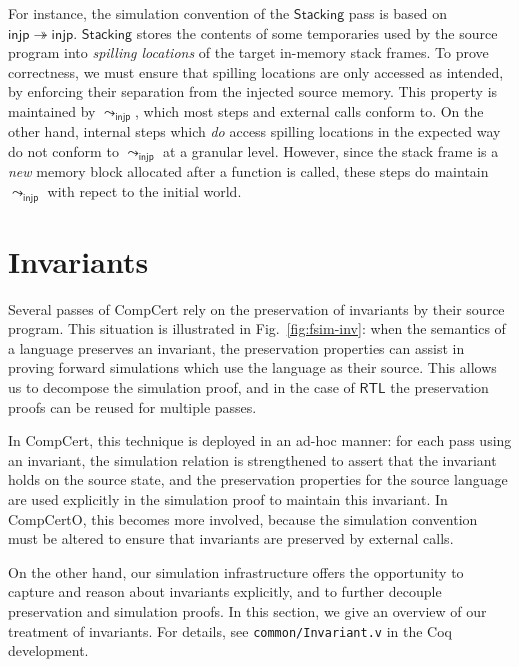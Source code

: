 \documentclass[acmsmall,screen,review,anonymous]{acmart}
\newcommand{\kw}[1]{\ensuremath{ \mathsf{#1} }}
\begin{document}
For instance,
the simulation convention of the \kw{Stacking} pass
is based on $\kw{injp} \twoheadrightarrow \kw{injp}$.
\kw{Stacking} stores the contents of some
temporaries used by the source program
into \emph{spilling locations}
of the target in-memory stack frames.
To prove correctness,
we must ensure that spilling locations
are only accessed as intended,
by enforcing their separation
from the injected source memory.
%
This property is maintained by $\leadsto_\kw{injp}$,
which most steps and external calls conform to.
On the other hand,
internal steps which \emph{do} access spilling locations
in the expected way
do not conform to $\leadsto_\kw{injp}$ at a granular level.
However,
since the stack frame is a \emph{new}
memory block allocated after a function is called,
these steps do maintain $\leadsto_\kw{injp}$
with repect to the initial world.



\section{Invariants} \label{sec:inv} %


Several passes of CompCert
rely on the preservation of invariants
by their source program.
This situation is illustrated in Fig.~\ref{fig:fsim-inv}:
when the semantics of a language preserves an invariant,
the preservation properties can assist
in proving forward simulations
which use the language as their source.
This allows us to decompose the simulation proof,
and in the case of $\kw{RTL}$
the preservation proofs can be reused for multiple passes.

In CompCert,
this technique is deployed in an ad-hoc manner:
for each pass using an invariant,
the simulation relation is strengthened to assert that
the invariant holds on the source state,
and the preservation properties for the source language
are used explicitly in the simulation proof
to maintain this invariant.
In CompCertO,
this becomes more involved,
because the simulation convention must be altered
to ensure that invariants are preserved
by external calls.

On the other hand,
our simulation infrastructure offers the opportunity
to capture and reason about invariants explicitly,
and to further decouple preservation and simulation proofs.
In this section,
we give an overview of our treatment of invariants.
For details,
see \texttt{common/Invariant.v}
in the Coq development.
\end{document}
